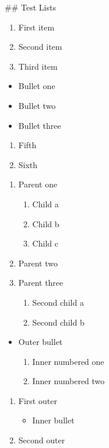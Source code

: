 \documentclass{article}
\begin{document}
## Test Lists

\begin{enumerate}
\item First item
\item Second item
\item Third item
\end{enumerate}

\begin{itemize}
\item Bullet one
\item Bullet two
\item Bullet three
\end{itemize}

\begin{enumerate}[start=5]
\item Fifth
\item Sixth
\end{enumerate}

\begin{enumerate}
\item Parent one
\begin{enumerate}
\item Child a
\item Child b
\item Child c
\end{enumerate}
\item Parent two
\item Parent three
\begin{enumerate}
\item Second child a
\item Second child b
\end{enumerate}
\end{enumerate}

\begin{itemize}
\item Outer bullet
\begin{enumerate}
\item Inner numbered one
\item Inner numbered two
\end{enumerate}
\end{itemize}

\begin{enumerate}
\item First outer
\begin{itemize}
\item Inner bullet
\end{itemize}
\item Second outer
\end{enumerate}
\end{document}
